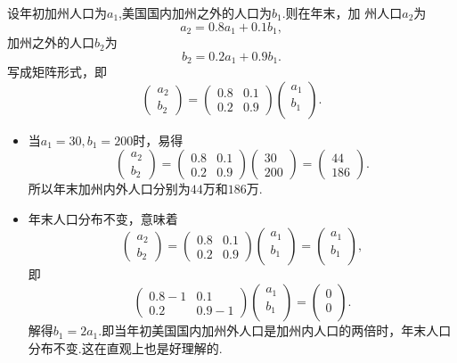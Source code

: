 ﻿\documentclass{book} \usepackage{exsheets} \usepackage{xeCJK}
\begin{document}
\begin{solution}
  设年初加州人口为$a_{1}$,美国国内加州之外的人口为$b_{1}$.则在年末，加
  州人口$a_{2}$为
$$
a_{2}=0.8a_{1}+0.1b_{1},
$$
加州之外的人口$b_2$为
$$
b_2=0.2a_{1}+0.9b_{1}.
$$
写成矩阵形式，即
$$
\begin{pmatrix}
  a_2\\
  b_2
\end{pmatrix}=
\begin{pmatrix}
  0.8&0.1\\
  0.2&0.9
\end{pmatrix}
\begin{pmatrix}
  a_{1}\\
  b_{1}\\
\end{pmatrix}.
$$
\begin{itemize}
\item 当$a_1=30,b_1=200$时，易得
$$
\begin{pmatrix}
  a_2\\
  b_2
\end{pmatrix}=
\begin{pmatrix}
  0.8&0.1\\
  0.2&0.9
\end{pmatrix}
\begin{pmatrix}
  30\\
  200
\end{pmatrix}=
\begin{pmatrix}
  44\\
  186
\end{pmatrix}.
$$
所以年末加州内外人口分别为$44$万和$186$万.
\item 年末人口分布不变，意味着
$$
\begin{pmatrix}
  a_2\\
  b_2
\end{pmatrix}=
\begin{pmatrix}
  0.8&0.1\\
  0.2&0.9
\end{pmatrix}
\begin{pmatrix}
  a_{1}\\
  b_{1}\\
\end{pmatrix}=
\begin{pmatrix}
  a_1\\
  b_1\\
\end{pmatrix},
$$
即
$$
\begin{pmatrix}
  0.8-1&0.1\\
  0.2&0.9-1
\end{pmatrix}
\begin{pmatrix}
  a_1\\
  b_1\\
\end{pmatrix}=
\begin{pmatrix}
  0\\
  0\\
\end{pmatrix}.
$$
解得$b_1=2a_1$.即当年初美国国内加州外人口是加州内人口的两倍时，年末人口
分布不变.这在直观上也是好理解的.
\end{itemize}
\end{solution}
\end{document}
